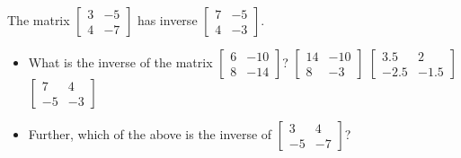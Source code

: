 \begin{activity}
The matrix \(\begin{bmatrix} 3&-5\\4&-7 \end{bmatrix}\) has inverse \(\begin{bmatrix} 7&-5\\4&-3 \end{bmatrix}\).
\begin{itemize}
\item What is the inverse of the matrix \(\begin{bmatrix} 6&-10\\8&-14 \end{bmatrix}\)?
{\(\begin{bmatrix} 14&-10\\8&-3 \end{bmatrix}\)}
{\(\begin{bmatrix} 3.5&2\\-2.5&-1.5 \end{bmatrix}\)}
{\(\begin{bmatrix} 7&4\\-5&-3 \end{bmatrix}\)}
\item Further, which of the above is the inverse of \(\begin{bmatrix} 3&4\\-5&-7 \end{bmatrix}\)?
\end{itemize}
\end{activity}





